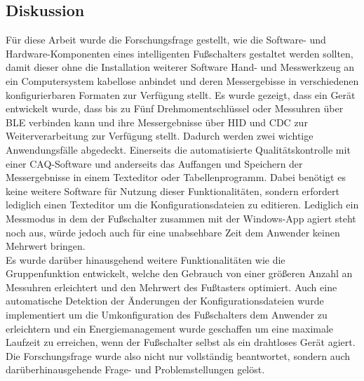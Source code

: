 \subsection{Diskussion}
Für diese Arbeit wurde die Forschungsfrage gestellt, wie die Software- und Hardware-Komponenten eines intelligenten Fußschalters gestaltet werden sollten, damit dieser ohne die Installation weiterer Software Hand- und Messwerkzeug an ein Computersystem kabellose anbindet und deren Messergebisse in verschiedenen konfigurierbaren Formaten zur Verfügung stellt. Es wurde gezeigt, dass ein Gerät entwickelt wurde, dass bis zu Fünf Drehmomentschlüssel oder Messuhren über \ac{BLE} verbinden kann und ihre Messergebnisse über \ac{HID} und \ac{CDC} zur Weiterverarbeitung zur Verfügung stellt. Dadurch werden zwei wichtige Anwendungsfälle abgedeckt. Einerseits die automatisierte Qualitätskontrolle mit einer \ac{CAQ}-Software und anderseits das Auffangen und Speichern der Messergebnisse in einem Texteditor oder Tabellenprogramm. Dabei benötigt es keine weitere Software für Nutzung dieser Funktionalitäten, sondern erfordert lediglich einen Texteditor um die Konfigurationsdateien zu editieren. Lediglich ein Messmodus in dem der Fußschalter zusammen mit der Windows-App agiert steht noch aus, würde jedoch auch für eine unabsehbare Zeit dem Anwender keinen Mehrwert bringen.\\
Es wurde darüber hinausgehend weitere Funktionalitäten wie die Gruppenfunktion entwickelt, welche den Gebrauch von einer größeren Anzahl an Messuhren erleichtert und den Mehrwert des Fußtasters optimiert. Auch eine automatische Detektion der Änderungen der Konfigurationsdateien wurde implementiert um die Umkonfiguration des Fußschalters dem Anwender zu erleichtern und ein Energiemanagement wurde geschaffen um eine maximale Laufzeit zu erreichen, wenn der Fußschalter selbst als ein drahtloses Gerät agiert.\\
Die Forschungsfrage wurde also nicht nur vollständig beantwortet, sondern auch darüberhinausgehende Frage- und Problemstellungen gelöst.


